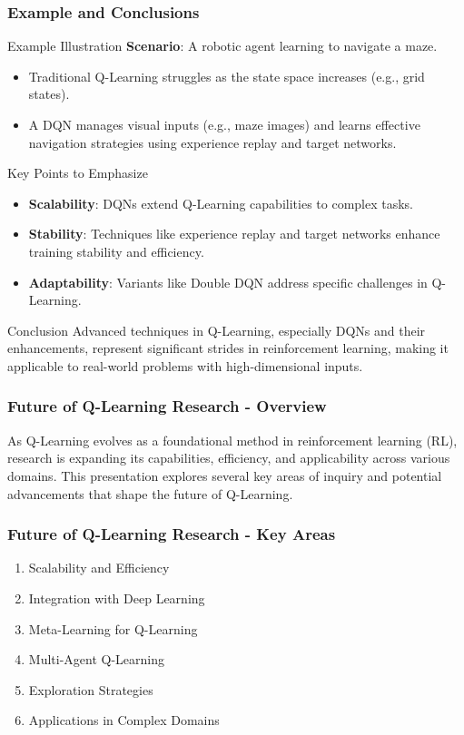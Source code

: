 \documentclass[aspectratio=169]{beamer}
\begin{document}
\begin{frame}[fragile]
    \frametitle{Example and Conclusions}
    \begin{block}{Example Illustration}
        \textbf{Scenario}: A robotic agent learning to navigate a maze.
        \begin{itemize}
            \item Traditional Q-Learning struggles as the state space increases (e.g., grid states).
            \item A DQN manages visual inputs (e.g., maze images) and learns effective navigation strategies using experience replay and target networks.
        \end{itemize}
    \end{block}

    \begin{block}{Key Points to Emphasize}
        \begin{itemize}
            \item \textbf{Scalability}: DQNs extend Q-Learning capabilities to complex tasks.
            \item \textbf{Stability}: Techniques like experience replay and target networks enhance training stability and efficiency.
            \item \textbf{Adaptability}: Variants like Double DQN address specific challenges in Q-Learning.
        \end{itemize}
    \end{block}

    \begin{block}{Conclusion}
        Advanced techniques in Q-Learning, especially DQNs and their enhancements, represent significant strides in reinforcement learning, making it applicable to real-world problems with high-dimensional inputs.
    \end{block}
\end{frame}

\begin{frame}[fragile]
    \frametitle{Future of Q-Learning Research - Overview}
    As Q-Learning evolves as a foundational method in reinforcement learning (RL), research is expanding its capabilities, efficiency, and applicability across various domains. This presentation explores several key areas of inquiry and potential advancements that shape the future of Q-Learning.
\end{frame}

\begin{frame}[fragile]
    \frametitle{Future of Q-Learning Research - Key Areas}
    \begin{enumerate}
        \item Scalability and Efficiency
        \item Integration with Deep Learning
        \item Meta-Learning for Q-Learning
        \item Multi-Agent Q-Learning
        \item Exploration Strategies
        \item Applications in Complex Domains
    \end{enumerate}
\end{frame}
\end{document}
